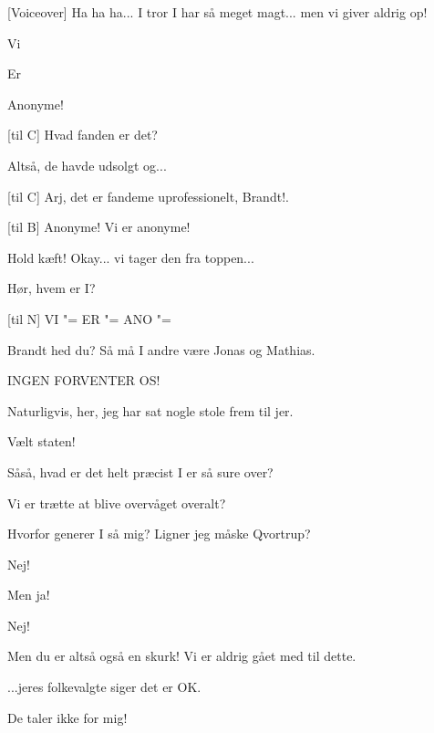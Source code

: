 \documentclass[a4paper,11pt]{article}
\begin{document}
\begin{sketch}
[Voiceover] Ha ha ha... I tror I har så meget magt... men vi
giver aldrig op!


 Vi


 Er


 Anonyme!


[til C] Hvad fanden er det?  

 Altså, de havde udsolgt og...

[til C] Arj, det er fandeme uprofessionelt, Brandt!.

[til B]  Anonyme!  Vi er anonyme!

 Hold kæft!  Okay... vi tager den fra toppen...

 Hør, hvem er I?

[til N] VI "= ER "= ANO "=

 Brandt hed du?   Så må I andre
være Jonas og Mathias.

 INGEN FORVENTER OS!

 Naturligvis, her, jeg har sat nogle stole frem til jer.


 Vælt staten!  

 Såså, hvad er det helt præcist I er så sure over?

 Vi er trætte at blive overvåget overalt?

 Hvorfor generer I så mig?  Ligner jeg måske Qvortrup?

 Nej!

 Men ja!

 Nej!

 Men du er altså også en skurk!  Vi er aldrig gået med til
dette.

 ...jeres folkevalgte siger det er OK.

 De taler ikke for mig!


\end{sketch}
\end{document}
